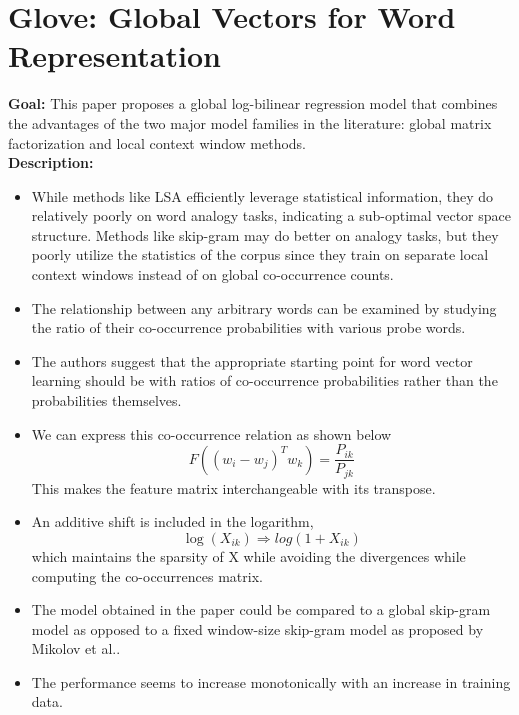 \documentclass[11pt,a4paper]{article}
\begin{document}


\section{Glove: Global Vectors for Word Representation} %
\label{sec:glove_global_vectors_for_word_representation}

  \textbf{Goal:}
  This paper proposes a global log-bilinear regression model that combines the advantages of the two major model families in the literature: global matrix factorization and local context window methods.\\

  \textbf{Description:}
  \begin{itemize}
    \item
    While methods like LSA efficiently leverage statistical information, they do relatively poorly on word analogy tasks, indicating a sub-optimal vector space structure. Methods like skip-gram may do better on analogy tasks, but they poorly utilize the statistics of the corpus since they train on separate local context windows instead of on global co-occurrence counts.
    \item
    The relationship between any arbitrary words can be examined by studying the ratio of their co-occurrence probabilities with various probe words.
    \item
    The authors suggest that the appropriate starting point for word vector learning should be with ratios of co-occurrence probabilities rather than the probabilities themselves.
    \item
    We can express this co-occurrence relation as shown below
    $$F((w_i - w_j)^T w_k) = \frac{P_{ik}}{P_{jk}}$$
    This makes the feature matrix interchangeable with its transpose.
    \item
    An additive shift is included in the logarithm, $$\log(X_{ik}) \Rightarrow log(1 + X_{ik})$$ which maintains the sparsity of X while avoiding the divergences while computing the co-occurrences matrix.
    \item
    The model obtained in the paper could be compared to a global skip-gram model as opposed to a fixed window-size skip-gram model as proposed by Mikolov et al.\cite{mikolov2013efficient}.
    \item
    The performance seems to increase monotonically with an increase in training data.
  \end{itemize}
\end{document}
